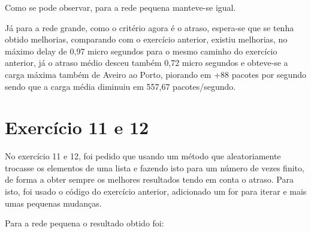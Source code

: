 \documentclass[pdftex,12pt,a4paper]{report}
\begin{document}


Como se pode observar, para a rede pequena manteve-se igual.

Já para a rede grande, como o critério agora é o atraso, espera-se que se tenha obtido melhorias, comparando com o exercício anterior, existiu melhorias, no máximo delay de 0,97 micro segundos para o mesmo caminho do exercício anterior, já o atraso médio desceu também 0,72 micro segundos e obteve-se a carga máxima também de Aveiro ao Porto, piorando em +88 pacotes por segundo sendo que a carga média diminuiu em 557,67 pacotes/segundo.






\section{Exercício 11 e 12}

No exercício 11 e 12, foi pedido que usando um método que aleatoriamente trocasse os elementos de uma lista e fazendo isto para um número de vezes finito, de forma a obter sempre os melhores resultados tendo em conta o atraso. Para isto, foi usado o código do exercício anterior, adicionado um for para iterar e mais umas pequenas mudanças.

Para a rede pequena o resultado obtido foi:





\newpage
\end{document}
